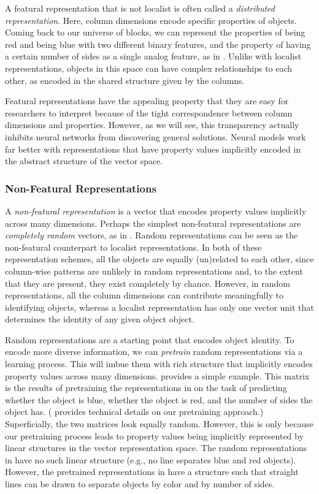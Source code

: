 \documentclass[9pt,twocolumn,twoside,lineno]{pnas-new}
\newcommand{\tech}[1]{\emph{#1}}
\begin{document}
{A featural representation that is not localist is often called a \tech{distributed representation}. Here, column dimensions encode specific properties of objects. Coming back to our universe of blocks, we can represent the properties of being red and being blue with two different binary features, and the property of having a certain number of sides as a single analog feature, as in . Unlike with localist representations, objects in this space can have complex relationships to each other, as encoded in the shared structure given by the columns.

Featural representations have the appealing property that they are easy for researchers to interpret because of the tight correspondence between column dimensions and properties. However, as we will see, this transparency actually inhibits neural networks from discovering general solutions. Neural models work far better with representations that have property values implicitly encoded in the abstract structure of the vector space.


\subsubsection{Non-Featural Representations}

A \tech{non-featural representation} is a vector that encodes property values implicitly across many dimensions. Perhaps the simplest non-featural representations are \tech{completely random} vectors, as in . Random representations can be seen as the non-featural counterpart to localist representations. In both of these representation schemes, all the objects are equally (un)related to each other, since column-wise patterns are unlikely in random representations and, to the extent that they are present, they exist completely by chance. However, in random representations, all the column dimensions can contribute meaningfully to identifying objects, whereas a localist representation has only one vector unit that determines the identity of any given object object.

Random representations are a starting point that encodes object identity. To encode more diverse information, we can \tech{pretrain} random representations via a learning process. This will imbue them with rich structure that implicitly encodes property values across many dimensions.  provides a simple example. This matrix is the results of pretraining the representations in  on the task of predicting whether the object is blue, whether the object is red, and the number of sides the object has. ( provides technical details on our pretraining approach.) Superficially, the two matrices look equally random. However, this is only because our pretraining process leads to property values being implicitly represented by linear structures in the vector representation space.  The random representations in  have no such linear structure (e.g., no line separates blue and red objects).  However, the pretrained representations in  have a structure such that straight lines can be drawn to separate objects by color and by number of sides.

}
\end{document}
